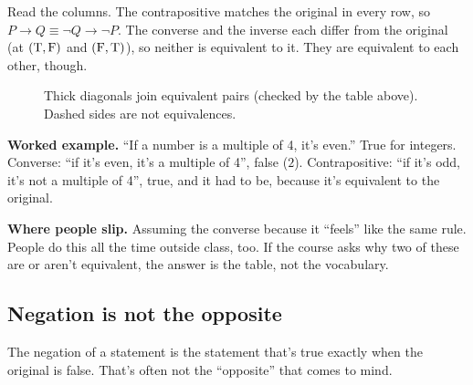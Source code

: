 Read the columns. The contrapositive matches the original in every row, so $P\to Q\equiv\lnot Q\to\lnot P$. The converse and the inverse each differ from the original (at $(\mathrm{T},\mathrm{F})$ and $(\mathrm{F},\mathrm{T})$), so neither is equivalent to it. They are equivalent to each other, though.

\begin{figure}[H]
\centering
{}
\caption{Thick diagonals join equivalent pairs (checked by the table above). Dashed sides are not equivalences.}
\end{figure}

\textbf{Worked example.} ``If a number is a multiple of 4, it's even.'' True for integers. Converse: ``if it's even, it's a multiple of 4'', false ($2$). Contrapositive: ``if it's odd, it's not a multiple of 4'', true, and it had to be, because it's equivalent to the original.

\textbf{Where people slip.} Assuming the converse because it ``feels'' like the same rule. People do this all the time outside class, too. If the course asks why two of these are or aren't equivalent, the answer is the table, not the vocabulary.

\subsection{Negation is not the opposite}

The negation of a statement is the statement that's true exactly when the original is false. That's often not the ``opposite'' that comes to mind.

